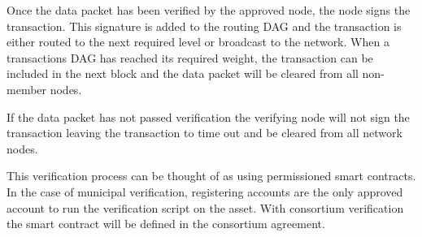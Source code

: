 \documentclass[12pt]{article}
\begin{document}
Once the data packet has been verified by the approved node, the node signs the 
transaction. This signature is added to the routing DAG and the transaction is either routed
		to the next required level or broadcast to the network.
When a transactions DAG has reached 
its required weight, the transaction can be included in the next block and the data
		packet will be cleared from all non-member nodes.

If the data packet has not passed verification the verifying node will not sign the transaction
leaving the transaction to time out and be cleared from all network nodes.

This verification process can be thought of as using permissioned smart contracts.  In the case of municipal
verification, registering accounts are the only approved account to run the verification script on the asset.
With consortium verification the smart contract will be defined in the consortium agreement.
\end{document}
